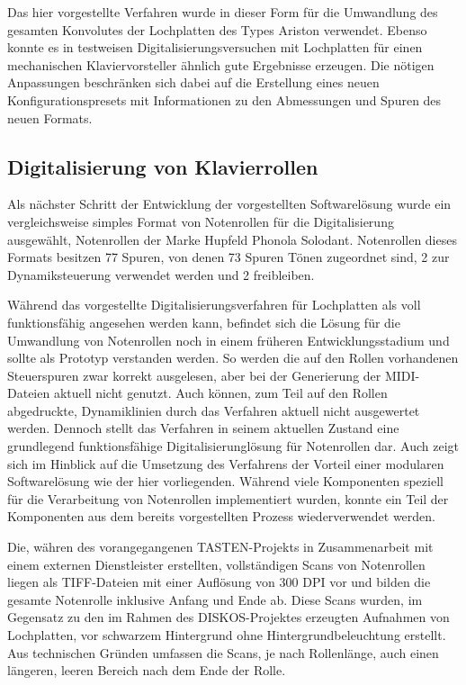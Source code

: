 Das hier vorgestellte Verfahren wurde in dieser Form für die Umwandlung des gesamten Konvolutes der Lochplatten des Types Ariston verwendet.
Ebenso konnte es in testweisen Digitalisierungsversuchen mit Lochplatten für einen mechanischen Klaviervorsteller ähnlich gute Ergebnisse erzeugen.
Die nötigen Anpassungen beschränken sich dabei auf die Erstellung eines neuen Konfigurationspresets mit Informationen zu den Abmessungen und Spuren des neuen Formats.

\subsection{Digitalisierung von Klavierrollen}

Als nächster Schritt der Entwicklung der vorgestellten Softwarelösung wurde ein vergleichsweise simples Format von Notenrollen für die Digitalisierung ausgewählt, Notenrollen der Marke Hupfeld Phonola Solodant.
Notenrollen dieses Formats besitzen 77 Spuren, von denen 73 Spuren Tönen zugeordnet sind, 2 zur Dynamiksteuerung verwendet werden und 2 freibleiben.

Während das vorgestellte Digitalisierungsverfahren für Lochplatten als voll funktionsfähig angesehen werden kann, befindet sich die Lösung für die Umwandlung von Notenrollen noch in einem früheren Entwicklungsstadium und sollte als Prototyp verstanden werden.
So werden die auf den Rollen vorhandenen Steuerspuren zwar korrekt ausgelesen, aber bei der Generierung der MIDI-Dateien aktuell nicht genutzt.
Auch können, zum Teil auf den Rollen abgedruckte, Dynamiklinien durch das Verfahren aktuell nicht ausgewertet werden.
Dennoch stellt das Verfahren in seinem aktuellen Zustand eine grundlegend funktionsfähige Digitalisierunglösung für Notenrollen dar.
Auch zeigt sich im Hinblick auf die Umsetzung des Verfahrens der Vorteil einer modularen Softwarelösung wie der hier vorliegenden.
Während viele Komponenten speziell für die Verarbeitung von Notenrollen implementiert wurden, konnte ein Teil der Komponenten aus dem bereits vorgestellten Prozess wiederverwendet werden.

Die, währen des vorangegangenen TASTEN-Projekts in Zusammenarbeit mit einem externen Dienstleister erstellten, vollständigen Scans von Notenrollen liegen als TIFF-Dateien mit einer Auflösung von 300 DPI vor und bilden die gesamte Notenrolle inklusive Anfang und Ende ab.
Diese Scans wurden, im Gegensatz zu den im Rahmen des DISKOS-Projektes erzeugten Aufnahmen von Lochplatten, vor schwarzem Hintergrund ohne Hintergrundbeleuchtung erstellt.
Aus technischen Gründen umfassen die Scans, je nach Rollenlänge, auch einen längeren, leeren Bereich nach dem Ende der Rolle.

